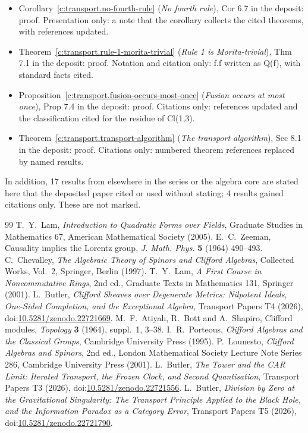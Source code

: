 \documentclass[11pt]{article}
\theoremstyle{definition}
\theoremstyle{plain}
\begin{document}
\begin{itemize}
\item Corollary~\ref{c:transport.no-fourth-rule} (\emph{No fourth rule}), Cor 6.7 in the deposit: proof. Presentation only: a note that the corollary collects the cited theorems, with references updated.
\item Theorem~\ref{c:transport.rule-1-morita-trivial} (\emph{Rule 1 is Morita-trivial}), Thm 7.1 in the deposit: proof. Notation and citation only: f.f written as Q(f), with standard facts cited.
\item Proposition~\ref{c:transport.fusion-occurs-most-once} (\emph{Fusion occurs at most once}), Prop 7.4 in the deposit: proof. Citations only: references updated and the classification cited for the residue of Cl(1,3).
\item Theorem~\ref{c:transport.transport-algorithm} (\emph{The transport algorithm}), Sec 8.1 in the deposit: proof. Citations only: numbered theorem references replaced by named results.
\end{itemize}
\noindent In addition, 17 results from elsewhere in the series or the algebra core are stated here that the deposited paper cited or used without stating; 4 results gained citations only. These are not marked.
\begin{thebibliography}{99}
 T.~Y.~Lam,
\emph{Introduction to Quadratic Forms over Fields},
Graduate Studies in Mathematics 67, American Mathematical Society (2005).
 E.~C.~Zeeman,
Causality implies the Lorentz group,
\emph{J. Math. Phys.} \textbf{5} (1964) 490--493.
 C.~Chevalley,
\emph{The Algebraic Theory of Spinors and Clifford Algebras},
Collected Works, Vol.~2, Springer, Berlin (1997).
 T.~Y.~Lam,
\emph{A First Course in Noncommutative Rings}, 2nd ed.,
Graduate Texts in Mathematics 131, Springer (2001).
 L.~Butler,
\emph{Clifford Sheaves over Degenerate Metrics: Nilpotent Ideals, One-Sided Completion, and the Exceptional Algebra},
Transport Papers T4 (2026), doi:\href{https://doi.org/10.5281/zenodo.22721669}{10.5281/zenodo.22721669}.
 M.~F.~Atiyah, R.~Bott and A.~Shapiro,
Clifford modules,
\emph{Topology} \textbf{3} (1964), suppl.~1, 3--38.
 I.~R.~Porteous,
\emph{Clifford Algebras and the Classical Groups},
Cambridge University Press (1995).
 P.~Lounesto,
\emph{Clifford Algebras and Spinors}, 2nd ed.,
London Mathematical Society Lecture Note Series 286, Cambridge University Press (2001).
 L.~Butler,
\emph{The Tower and the CAR Limit: Iterated Transport, the Frozen Clock, and Second Quantisation},
Transport Papers T3 (2026), doi:\href{https://doi.org/10.5281/zenodo.22721556}{10.5281/zenodo.22721556}.
 L.~Butler,
\emph{Division by Zero at the Gravitational Singularity: The Transport Principle Applied to the Black Hole, and the Information Paradox as a Category Error},
Transport Papers T5 (2026), doi:\href{https://doi.org/10.5281/zenodo.22721790}{10.5281/zenodo.22721790}.
\end{thebibliography}
\end{document}
